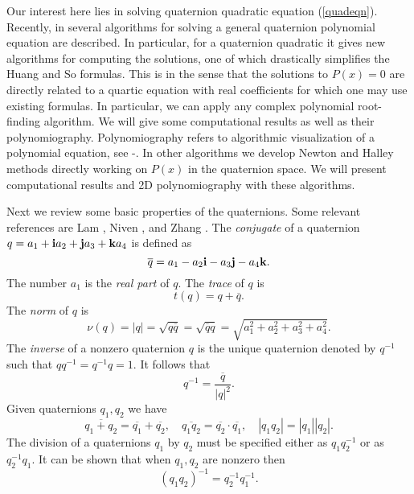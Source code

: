 \documentclass{article}
\theoremstyle{definition}
\begin{document}
Our interest here lies in solving quaternion quadratic
equation (\ref{quadeqn}). Recently, in \cite{kalQ} several algorithms for solving a general quaternion polynomial
equation are described. In particular, for a quaternion quadratic it  gives new
algorithms for computing the solutions, one of which drastically
simplifies the Huang and So \cite{Huang} formulas. This is in the
sense that the solutions to $P(x)=0$ are directly related to a
quartic equation with real coefficients for which one may use existing formulas. In particular, we can
apply any complex polynomial root-finding algorithm. We will
give some computational results as well as their polynomiography.
Polynomiography refers to algorithmic visualization of a polynomial equation, see \cite{kalbook}-\cite{kal2005c}. In
other algorithms we develop Newton and Halley methods directly
working on $P(x)$ in the quaternion space. We will present computational
results and 2D polynomiography with these algorithms.

Next we review some basic properties of the quaternions. Some
relevant references are Lam \cite{Lam}, Niven \cite{Niven}, and
Zhang \cite{Zhang}. The {\it conjugate} of a quaternion $q=a_1+{\bf
i}a_2+{\bf j}a_3+{\bf k}a_4$ is defined as
\begin{equation}
\overline q =a_1-a_2{\bf i}-a_3{\bf j}-a_4{\bf k}.
\end{equation}
The number $a_1$ is the {\it real part} of $q$. The {\it trace} of $q$ is
\begin{equation}
t(q)=q+ \overline q.
\end{equation}
The {\it norm} of $q$ is
\begin{equation}
\nu(q)=|q | = \sqrt{q \overline q} = \sqrt{\overline q q} = \sqrt{a_1^2+a_2^2+a_3^2+a_4^2}.
\end{equation}
The {\it inverse} of a nonzero quaternion $q$  is the unique quaternion denoted by $q^{-1}$ such that $q q^{-1}=q^{-1}q=1$.
It follows that
\begin{equation}
q^{-1}=  \frac{\overline q }{| q |^2}.
\end{equation}
Given quaternions $q_1, q_2$ we have
\begin{equation}
\overline {q_1+q_2}=\overline {q_1} + \overline {q_2}, \quad \overline{q_1q_2}= \overline {q_2} \cdot  \overline{q_1}, \quad |q_1q_2|= |q_1||q_2|.
\end{equation}
The division of a quaternions $q_1$ by $q_2$ must be specified either as  $q_1  q_2^{-1}$ or as $q_2^{-1}  q_1$.
It can be shown that when  $q_1, q_2$ are nonzero then
\begin{equation}
(q_1q_2)^{-1}=q_2^{-1}q_{1}^{-1}.
\end{equation}
\end{document}
